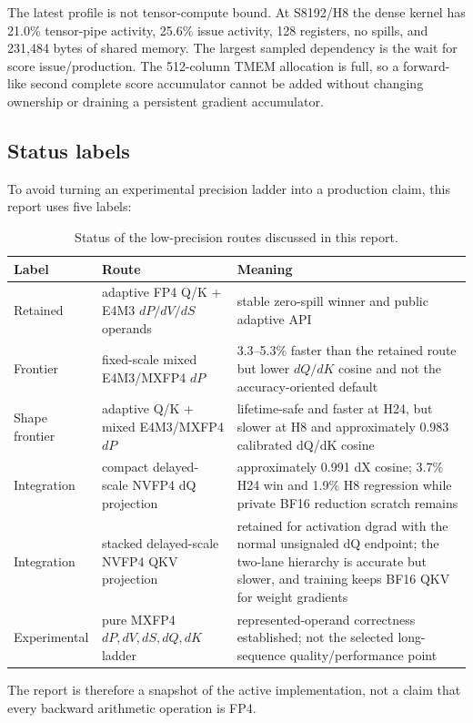 The latest profile is not tensor-compute bound.  At S8192/H8 the dense kernel
has 21.0\% tensor-pipe activity, 25.6\% issue activity, 128 registers, no
spills, and 231,484 bytes of shared memory.  The largest sampled dependency is
the wait for score issue/production.  The 512-column TMEM allocation is full,
so a forward-like second complete score accumulator cannot be added without
changing ownership or draining a persistent gradient accumulator.

\subsection{Status labels}

To avoid turning an experimental precision ladder into a production claim,
this report uses five labels:

\begin{table}[htbp]
\centering
\caption{Status of the low-precision routes discussed in this report.}
\label{tab:route-status}
\small
\begin{tabularx}{\textwidth}{l l X}
\toprule
Label & Route & Meaning \\
\midrule
Retained & adaptive FP4 Q/K + E4M3 $dP/dV/dS$ operands &
stable zero-spill winner and public adaptive API \\
Frontier & fixed-scale mixed E4M3/MXFP4 $dP$ &
3.3--5.3\% faster than the retained route but lower $dQ/dK$ cosine and not
the accuracy-oriented default \\
Shape frontier & adaptive Q/K + mixed E4M3/MXFP4 $dP$ &
lifetime-safe and faster at H24, but slower at H8 and approximately 0.983
calibrated dQ/dK cosine \\
Integration & compact delayed-scale NVFP4 dQ projection &
approximately 0.991 dX cosine; 3.7\% H24 win and 1.9\% H8 regression while
private BF16 reduction scratch remains \\
Integration & stacked delayed-scale NVFP4 QKV projection &
retained for activation dgrad with the normal unsignaled dQ endpoint; the
two-lane hierarchy is accurate but slower, and training keeps BF16 QKV for
weight gradients \\
Experimental & pure MXFP4 $dP,dV,dS,dQ,dK$ ladder &
represented-operand correctness established; not the selected long-sequence
quality/performance point \\
\bottomrule
\end{tabularx}
\end{table}

The report is therefore a snapshot of the active implementation, not a claim
that every backward arithmetic operation is FP4.
